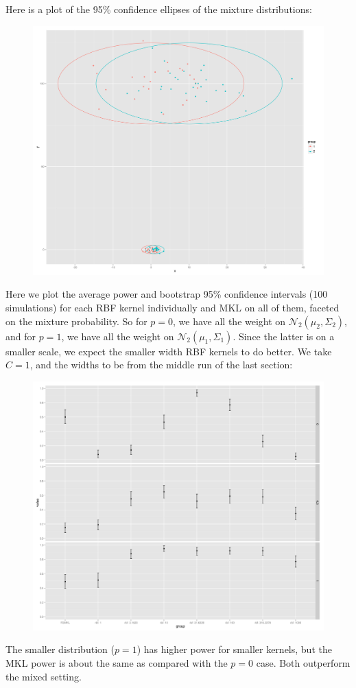 Here is a plot of the 95\% confidence ellipses of the mixture distributions:
\begin{figure}[!ht]
  \centering
  \includegraphics[scale=.3]{vectorial_distributions.png}  
\end{figure}

Here we plot the average power and bootstrap 95\% confidence intervals
(100 simulations) for each RBF kernel individually and MKL on all of
them, faceted on the mixture probability.  So for $p = 0$, we have all
the weight on $\mathcal{N}_2(\mu_2, \Sigma_2)$, and for $p = 1$, we
have all the weight on $\mathcal{N}_2(\mu_1, \Sigma_1)$.  Since the
latter is on a smaller scale, we expect the smaller width RBF kernels
to do better.  We take $C = 1$, and the widths to be from the middle
run of the last section:
\begin{figure}[!ht]
  \centering
  \includegraphics[scale=.3]{vectorial_power.png}
\end{figure}
The smaller distribution ($p=1$) has higher power for smaller kernels,
but the MKL power is about the same as compared with the $p=0$ case.
Both outperform the mixed setting.

